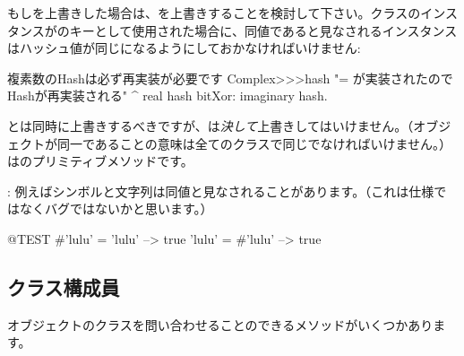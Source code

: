 \documentclass[a4paper,10pt,twoside]{book}
\begin{document}
もし\ct{=}を上書きした場合は、を上書きすることを検討して下さい。クラスのインスタンスがのキーとして使用された場合に、同値であると見なされるインスタンスはハッシュ値が同じになるようにしておかなければいけません:
\begin{method}{複素数のHashは必ず再実装が必要です}
Complex>>>hash
    "= が実装されたのでHashが再実装される"
    ^ real hash bitXor: imaginary hash.
\end{method}

\ct{=}とは同時に上書きするべきですが、\ct{==}は\emph{決して}上書きしてはいけません。（オブジェクトが同一であることの意味は全てのクラスで同じでなければいけません。）\ct{==}はのプリミティブメソッドです。

: 例えばシンボルと文字列は同値と見なされることがあります。（これは仕様ではなくバグではないかと思います。）

\begin{code}{@TEST}
#'lulu' = 'lulu' --> true
'lulu' = #'lulu' --> true
\end{code}


\subsection{クラス構成員}
オブジェクトのクラスを問い合わせることのできるメソッドがいくつかあります。
\end{document}
